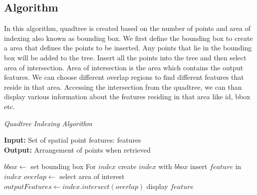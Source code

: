 \subsection{Algorithm}
In this algorithm, quadtree is created based on the number of points and area of indexing also known as bounding box. We first define the bounding box to create a area that defines the points to be inserted. Any points that lie in the bounding box will be added to the tree. Insert all the points into the tree and then select area of intersection. Area of intersection is the area which contains the output features. We can choose different overlap regions to find different features that reside in that area. Accessing the intersection from the quadtree, we can than display various information about the features residing in that area like id, bbox etc.
\begin{algorithm}[h]
    \caption{\em Quadtree Indexing Algorithm }
    \textbf{Input:} Set of spatial point features: features \\
	\textbf{Output:} Arrangement of points when retrieved
	
	\begin{algorithmic}[1]
	    \State $bbox \gets$ set bounding box For $index$
	    \State create $index$ with $bbox$
	        \State insert $feature$ in $index$
	    \ENDFOR
	    \State $overlap \gets$ select area of interest
	    \State $outputFeatures \gets index.intersect(overlap) $
	        \State display $feature$
	    \ENDFOR
	\end{algorithmic}
\end{algorithm}
